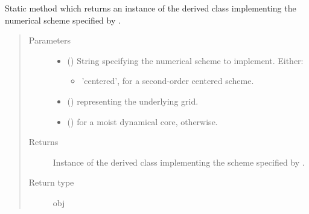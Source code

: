 \documentclass[letterpaper,10pt,english]{sphinxmanual}
\begin{document}
\begin{fulllineitems}
\begin{fulllineitems}
\label{\detokenize{api:tasmania.dycore.flux_isentropic_nonconservative.FluxIsentropicNonconservative.factory}}
Static method which returns an instance of the derived class implementing the numerical scheme
specified by .
\begin{quote}\begin{description}
\item[{Parameters}] \leavevmode\begin{itemize}
\item {} 
 () \textendash{} 
String specifying the numerical scheme to implement. Either:
\begin{itemize}
\item {} 
’centered’, for a second-order centered scheme.

\end{itemize}


\item {} 
 () \textendash{} {\hyperref[\detokenize{api:tasmania.grids.grid_xyz.GridXYZ}]{}} representing the underlying grid.

\item {} 
 () \textendash{}  for a moist dynamical core,  otherwise.

\end{itemize}

\item[{Returns}] \leavevmode
Instance of the derived class implementing the scheme specified by .

\item[{Return type}] \leavevmode
obj

\end{description}\end{quote}

\end{fulllineitems}



\end{fulllineitems}
\end{document}
